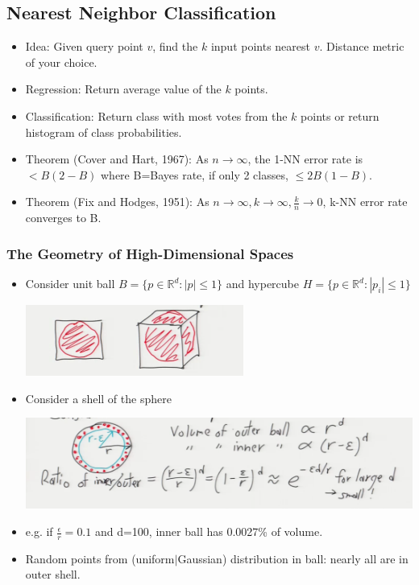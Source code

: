 \documentclass[10pt]{article}
\newcommand{\R}{\mathbb{R}}
\begin{document}
\subsection*{Nearest Neighbor Classification}
\begin{itemize}
	\item Idea: Given query point $v$, find the $k$ input points nearest $v$. Distance metric of your choice.
	\item Regression: Return average value of the $k$ points.
	\item Classification: Return class with most votes from the $k$ points or return histogram of class probabilities.
	\item Theorem (Cover and Hart, 1967): As $n \rightarrow \infty$, the 1-NN error rate is $< B(2-B)$ where B=Bayes rate, if only 2 classes, $\leq 2B(1-B)$.
	\item Theorem (Fix and Hodges, 1951): As $n \rightarrow \infty, k \rightarrow \infty, \frac{k}{n} \rightarrow 0$, k-NN error rate converges to B.
\end{itemize}

\subsubsection*{The Geometry of High-Dimensional Spaces}
\begin{itemize}
	\item Consider unit ball $B = \{p \in \R^{d}: |p| \leq 1\}$ and hypercube $H = \{p \in \R^{d}: |p_{i}| \leq 1\}$
		\begin{center}
			\includegraphics{../images/unitball}
		\end{center}
	\item Consider a shell of the sphere
		\begin{center}
			\includegraphics{../images/ell}
		\end{center}
	\item e.g. if $\frac{\epsilon}{r} = 0.1$ and d=100, inner ball has 0.0027\% of volume.
	\item Random points from (uniform$|$Gaussian) distribution in ball: nearly all are in outer shell.
\end{itemize}
\end{document}
